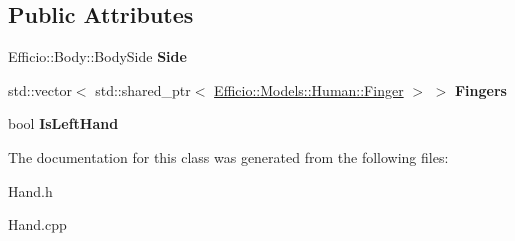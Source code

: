 \subsection*{Public Attributes}
\begin{DoxyCompactItemize}
\item 
Efficio\+::\+Body\+::\+Body\+Side {\bfseries Side}\hypertarget{class_efficio_1_1_models_1_1_human_1_1_hand_a9ead927dffc76db7a048cde9d3978c4d}{}\label{class_efficio_1_1_models_1_1_human_1_1_hand_a9ead927dffc76db7a048cde9d3978c4d}

\item 
std\+::vector$<$ std\+::shared\+\_\+ptr$<$ \hyperlink{class_efficio_1_1_models_1_1_human_1_1_finger}{Efficio\+::\+Models\+::\+Human\+::\+Finger} $>$ $>$ {\bfseries Fingers}\hypertarget{class_efficio_1_1_models_1_1_human_1_1_hand_a0d5ed07e8dbcd9ac8b2f64ffb82f44b5}{}\label{class_efficio_1_1_models_1_1_human_1_1_hand_a0d5ed07e8dbcd9ac8b2f64ffb82f44b5}

\item 
bool {\bfseries Is\+Left\+Hand}\hypertarget{class_efficio_1_1_models_1_1_human_1_1_hand_afae34ecc8e6f744ef02b8a2e436b9b83}{}\label{class_efficio_1_1_models_1_1_human_1_1_hand_afae34ecc8e6f744ef02b8a2e436b9b83}

\end{DoxyCompactItemize}


The documentation for this class was generated from the following files\+:\begin{DoxyCompactItemize}
\item 
Hand.\+h\item 
Hand.\+cpp\end{DoxyCompactItemize}
